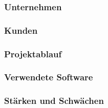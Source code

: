 \subsubsection{Unternehmen}

\subsubsection{Kunden}

\subsubsection{Projektablauf}

\subsubsection{Verwendete Software}

\subsubsection{Stärken und Schwächen}
